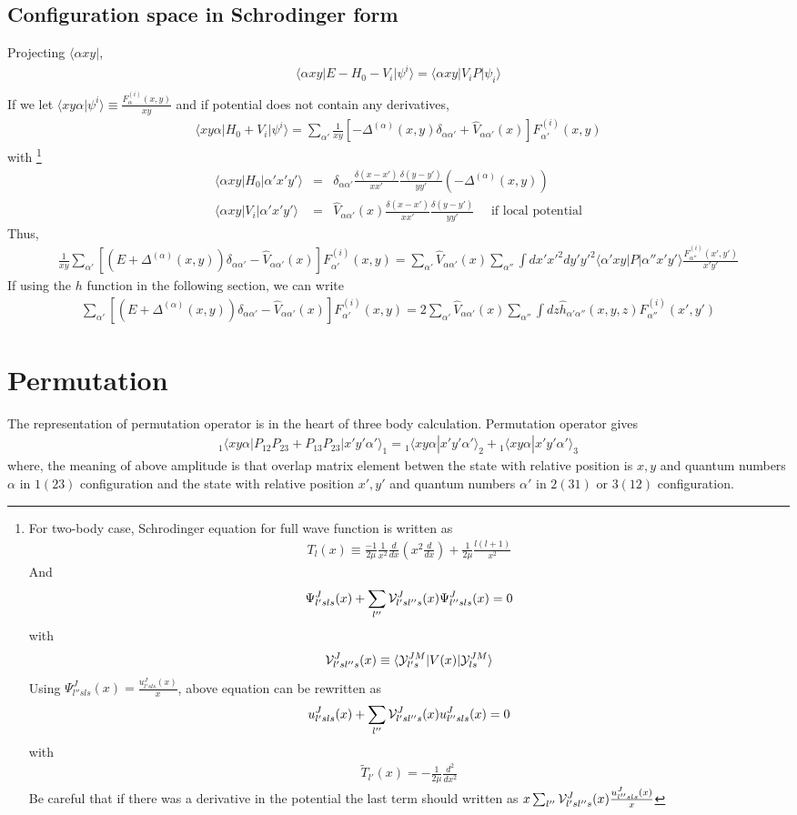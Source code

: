 \documentclass[11pt]{article}
\newcommand{\bea}{\begin{eqnarray}}
\newcommand{\eea}{\end{eqnarray}}
\newcommand{\no}{\nonumber \\}
\newcommand{\la}{\langle}
\newcommand{\ra}{\rangle}
\begin{document}
\subsection{Configuration space in Schrodinger form}
Projecting $\la \alpha xy|$,
\bea
\la \alpha xy|E-H_0-V_i|\psi^i\ra=\la \alpha xy|V_i P|\psi_i\ra \no
\eea
If we let 
$\la xy\alpha |\psi^i\ra\equiv \frac{F^{(i)}_\alpha(x,y)}{xy}$ 
and if potential does not contain any derivatives,
\bea
\la xy\alpha|H_0+V_i|\psi^i\ra = 
\sum_{\alpha'}
\frac{1}{xy}[-\Delta^{(\alpha)}(x,y)\delta_{\alpha\alpha'}
             +\hat{V}_{\alpha\alpha'}(x) ] F^{(i)}_{\alpha'}(x,y)
\eea
with
\footnote{
For two-body case, Schrodinger equation for full wave
function is written as
\bea
T_l(x)\equiv \frac{-1}{2\mu}\frac{1}{x^2}\frac{d}{dx}(x^2\frac{d}{dx})+\frac{1}{2\mu}\frac{l(l+1)}{x^2} 
\eea
And
\bea
[T_{l'}(x)-E]\Psi^J_{l's ls}(x)
+\sum_{l''}{\cal V}^J_{l'sl''s}(x)\Psi^J_{l''s ls}(x)=0
\eea
with
\bea
{\cal V}^J_{l'sl''s}(x)\equiv
\la {\cal Y}^{JM}_{l's}|V(x)|{\cal Y}^{JM}_{ls}\ra
\eea
Using $\Psi^J_{l''s ls}(x)=\frac{u^J_{l's ls}(x)}{x}$,
above equation can be rewritten as
\bea
[\tilde{T}_{l'}(x)-E]u^J_{l's ls}(x)
+\sum_{l''}{\cal V}^J_{l'sl''s}(x)u ^J_{l''s ls}(x)=0
\eea
with
\bea
\tilde{T}_{l'}(x)=-\frac{1}{2\mu}\frac{d^2}{dx^2}
\eea
Be careful that if there was a derivative in the potential
the last term should written as 
$x \sum_{l''}{\cal V}^J_{l'sl''s}(x)\frac{u ^J_{l''s ls}(x)}{x}$
}
\bea
\la \alpha x y|H_0|\alpha' x' y'\ra&=&\delta_{\alpha\alpha'}
                                 \frac{\delta(x-x')}{xx'}
                                 \frac{\delta(y-y')}{yy'}
                                 (-\Delta^{(\alpha)}(x,y)) \no
\la \alpha xy|V_i|\alpha' x' y'\ra&=&
       \hat{V}_{\alpha\alpha'}(x)
       \frac{\delta(x-x')}{xx'}\frac{\delta(y-y')}{yy'} 
       \quad \mbox{ if local potential}                 
\eea
Thus,
\bea
\frac{1}{xy}\sum_{\alpha'}
[(E+\Delta^{(\alpha)}(x,y))\delta_{\alpha\alpha'}
 -\hat{V}_{\alpha\alpha'}(x)]F^{(i)}_{\alpha'}(x,y)
=\sum_{\alpha'} \hat{V}_{\alpha\alpha'}(x)
 \sum_{\alpha''}\int dx' x'^2 dy' y'^2 
   \la \alpha' x y|P|\alpha'' x' y'\ra 
   \frac{F^{(i)}_{\alpha''}(x',y')}{x' y'}  
\eea
If using the $h$ function in the following section,
we can write
\bea
\sum_{\alpha'}
[(E+\Delta^{(\alpha)}(x,y))\delta_{\alpha\alpha'}
 -\hat{V}_{\alpha\alpha'}(x)]F^{(i)}_{\alpha'}(x,y)
=2\sum_{\alpha'} \hat{V}_{\alpha\alpha'}(x)
 \sum_{\alpha''}\int dz\hat{h}_{\alpha'\alpha''}(x,y,z)  
  F^{(i)}_{\alpha''}(x',y')  
\eea
\section{Permutation}
The representation of permutation operator is in the heart of three body calculation.
Permutation operator gives
\bea
{}_1\la x y\alpha| P_{12}P_{23}+P_{13}P_{23}|x' y' \alpha'\ra_1
={}_1\la xy \alpha|x' y'\alpha'\ra_2+{}_1\la xy \alpha|x' y'\alpha'\ra_3
\eea
where, the meaning of above amplitude is that
overlap matrix element betwen the state with
relative position is $x, y$ and quantum numbers $\alpha$ 
in $1(23)$ configuration and 
the state with relative position $x',y'$ and quantum numbers
$\alpha'$ in $2(31)$ or $3(12)$ configuration. 
\end{document}
